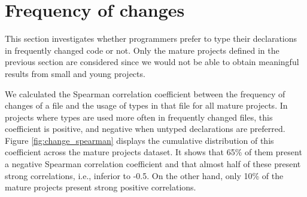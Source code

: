 \documentclass[msc]{ppgccufmg}
\begin{document}
% 


\section{Frequency of changes\label{sec:results-changes}}
This section investigates whether programmers prefer to type their declarations in frequently changed code or not.
Only the mature projects defined in the previous section are considered since we would not be able to obtain meaningful results from small and young projects.

We calculated the Spearman correlation coefficient between the frequency of changes of a file and the usage of types in that file for all mature projects.
In projects where types are used more often in frequently changed files, this coefficient is positive, and negative when untyped declarations are preferred.
Figure \ref{fig:change_spearman} displays the cumulative distribution of this coefficient across the mature projects dataset.
It shows that 65\% of them present a negative Spearman correlation coefficient and that almost half of these present strong correlations, i.e., inferior to -0.5.
On the other hand, only 10\% of the mature projects present strong positive correlations.
\end{document}
